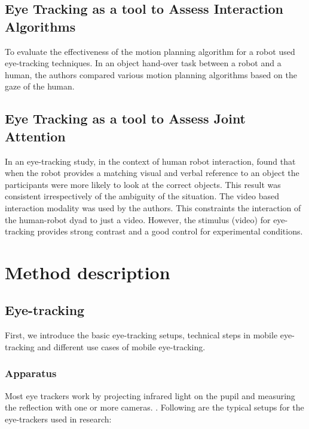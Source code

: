 \documentclass{sig-alternate}
\begin{document}
\subsection{Eye Tracking as a tool to Assess Interaction Algorithms}

To evaluate the effectiveness of the motion planning algorithm for a robot
\cite{dehais2011physiological} used eye-tracking techniques. In an object
hand-over task between a robot and a human, the authors compared various motion
planning algorithms based on the gaze of the human.

\subsection{Eye Tracking as a tool to Assess Joint Attention}

In an eye-tracking study, in the context of human robot interaction,
\cite{staudte2009visual} found that when the robot provides a matching visual
and verbal reference to an object the participants were more likely to look at
the correct objects. This result was consistent irrespectively of the ambiguity
of the situation. The video based interaction modality was used by the authors.
This constraints the  interaction of the human-robot dyad to just a video.
However, the stimulus (video) for eye-tracking provides strong contrast and a
good control for experimental conditions.



\section{Method description}
\label{method}

\subsection{Eye-tracking}
First, we introduce the basic eye-tracking setups, technical steps in mobile eye-tracking and different use cases of mobile eye-tracking.

\subsubsection{Apparatus}

Most eye trackers work by projecting infrared light on the pupil and measuring the reflection with one or more cameras. . Following are the typical setups for the eye-trackers used in research:
\end{document}
